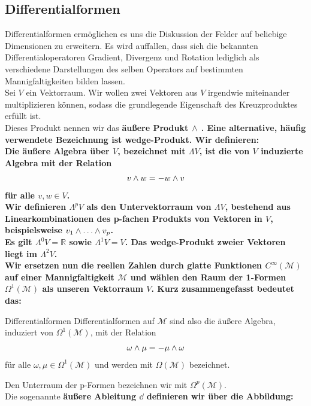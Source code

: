 \subsection{Differentialformen}
Differentialformen ermöglichen es uns die Diskussion der Felder auf beliebige Dimensionen zu erweitern. Es wird auffallen, dass sich die bekannten Differentialoperatoren Gradient, Divergenz und Rotation lediglich als verschiedene Darstellungen des selben Operators auf bestimmten Mannigfaltigkeiten bilden lassen. \\
Sei $V$ ein Vektorraum. Wir wollen zwei Vektoren aus $V$ irgendwie miteinander multiplizieren können, sodass die grundlegende Eigenschaft des Kreuzproduktes erfüllt ist. \\
Dieses Produkt nennen wir das \bfseries äußere Produkt $\wedge$ \normalfont. Eine alternative, häufig verwendete Bezeichnung ist \bfseries wedge-Produkt. \normalfont
Wir definieren: \\
Die äußere Algebra über $V$, bezeichnet mit $\Lambda V$, ist die von $V$ induzierte Algebra mit der Relation
\begin{align}
v \wedge w = -w \wedge v
\end{align}
für alle $v,w \in V$. \\
Wir definieren $\Lambda^p V$ als den Untervektorraum von $\Lambda V$, bestehend aus Linearkombinationen des p-fachen Produkts von Vektoren in $V$, beispielsweise $v_1 \w \dots \w v_p$. \\
Es gilt $\Lambda^0 V = \mathbb{R}$ sowie $\Lambda^1 V = V$. Das wedge-Produkt zweier Vektoren liegt im $\Lambda^2 V$. \\
Wir ersetzen nun die reellen Zahlen durch glatte Funktionen $C^{\infty}(\mathcal{M})$ auf einer Mannigfaltigkeit $\mathcal{M}$ und wählen den Raum der 1-Formen $\Omega^1(\mathcal{M})$ als unseren Vektorraum $V$. Kurz zusammengefasst bedeutet das:
\begin{mybox}{Differentialformen}
Differentialformen auf $\mathcal{M}$ sind also die äußere Algebra, induziert von $\Omega^1(\mathcal{M})$, mit der Relation 
\begin{align*}
\omega \wedge \mu = -\mu \wedge \omega 
\end{align*} 
für alle $\omega, \mu \in \Omega^1(\mathcal{M})$ und werden mit $\Omega(\mathcal{M})$ bezeichnet.
\end{mybox}
Den Unterraum der p-Formen bezeichnen wir mit $\Omega^p(\mathcal{M})$. \\
Die sogenannte \bfseries äußere Ableitung $\dd$ \normalfont definieren wir über die Abbildung:
